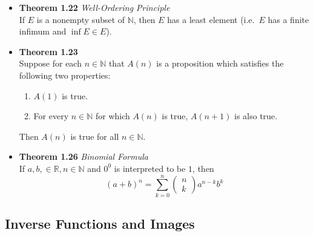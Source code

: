 \documentclass[11pt,a4paper]{article}
\begin{document}
\begin{itemize}
    \item \textbf{Theorem 1.22} \emph{Well-Ordering Principle} \\
        If $E$ is a nonempty subset of $\mathbb{N}$, then $E$ has a least element
        (i.e.\ $E$ has a finite infimum and $\inf E \in E$).
    \item \textbf{Theorem 1.23} \\
        Suppose for each $n \in \mathbb{N}$ that $A(n)$ is a proposition which satisfies
        the following two properties:
        \begin{enumerate}
            \item $A(1)$ is true.
            \item For every $n \in \mathbb{N}$ for which $A(n)$ is true, $A(n+1)$ is also true.
        \end{enumerate}
        Then $A(n)$ is true for all $n \in \mathbb{N}$.
    \item \textbf{Theorem 1.26} \emph{Binomial Formula} \\
        If $a, b, \in \mathbb{R}, n \in \mathbb{N}$ and $0^0$ is interpreted to be $1$, then
        \[
            {(a+b)}^n = \sum_{k=0}^n
            \begin{pmatrix}
                n \\ k
            \end{pmatrix}
            a^{n-k} b^k
        \]
\end{itemize}

\subsection{Inverse Functions and Images}
\end{document}
